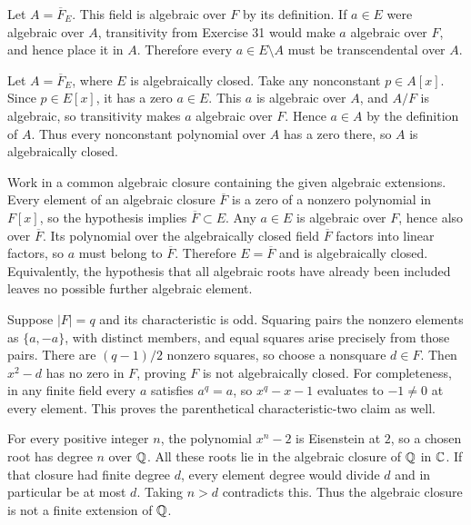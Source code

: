 Let $A=\overline F_E$. This field is algebraic over $F$ by its definition. If $a\in E$ were algebraic over $A$, transitivity from Exercise 31 would make $a$ algebraic over $F$, and hence place it in $A$. Therefore every $a\in E\setminus A$ must be transcendental over $A$.

Let $A=\overline F_E$, where $E$ is algebraically closed. Take any nonconstant $p\in A[x]$. Since $p\in E[x]$, it has a zero $a\in E$. This $a$ is algebraic over $A$, and $A/F$ is algebraic, so transitivity makes $a$ algebraic over $F$. Hence $a\in A$ by the definition of $A$. Thus every nonconstant polynomial over $A$ has a zero there, so $A$ is algebraically closed.

Work in a common algebraic closure containing the given algebraic extensions. Every element of an algebraic closure $\overline F$ is a zero of a nonzero polynomial in $F[x]$, so the hypothesis implies $\overline F\subset E$.
Any $a\in E$ is algebraic over $F$, hence also over $\overline F$. Its polynomial over the algebraically closed field $\overline F$ factors into linear factors, so $a$ must belong to $\overline F$. Therefore $E=\overline F$ and is algebraically closed. Equivalently, the hypothesis that all algebraic roots have already been included leaves no possible further algebraic element.

Suppose $|F|=q$ and its characteristic is odd. Squaring pairs the nonzero elements as $\{a,-a\}$, with distinct members, and equal squares arise precisely from those pairs. There are $(q-1)/2$ nonzero squares, so choose a nonsquare $d\in F$. Then $x^2-d$ has no zero in $F$, proving $F$ is not algebraically closed.
For completeness, in any finite field every $a$ satisfies $a^q=a$, so $x^q-x-1$ evaluates to $-1\ne0$ at every element. This proves the parenthetical characteristic-two claim as well.

For every positive integer $n$, the polynomial $x^n-2$ is Eisenstein at $2$, so a chosen root has degree $n$ over $\mathbb{Q}$. All these roots lie in the algebraic closure of $\mathbb{Q}$ in $\mathbb{C}$. If that closure had finite degree $d$, every element degree would divide $d$ and in particular be at most $d$. Taking $n>d$ contradicts this. Thus the algebraic closure is not a finite extension of $\mathbb{Q}$.

